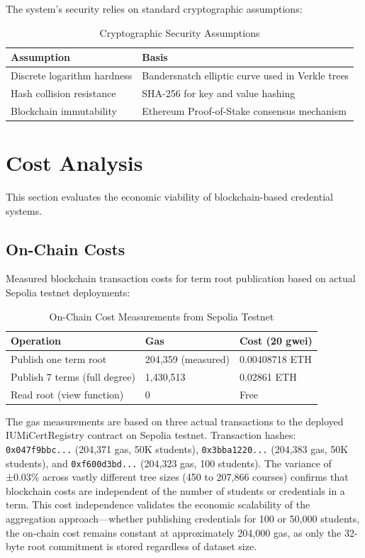 The system's security relies on standard cryptographic assumptions:

\begin{table}[H]
\centering
\caption{Cryptographic Security Assumptions}
\label{tab:crypto-assumptions}
\begin{tabular}{|p{5.5cm}|p{6.5cm}|}
\hline
\textbf{Assumption} & \textbf{Basis} \\
\hline
Discrete logarithm hardness & Bandersnatch elliptic curve used in Verkle trees \\
\hline
Hash collision resistance & SHA-256 for key and value hashing \\
\hline
Blockchain immutability & Ethereum Proof-of-Stake consensus mechanism \\
\hline
\end{tabular}
\end{table}

\section{Cost Analysis}
\label{sec:cost-analysis}

This section evaluates the economic viability of blockchain-based credential systems.

\subsection{On-Chain Costs}
\label{subsec:onchain-costs}

Measured blockchain transaction costs for term root publication based on actual Sepolia testnet deployments:

\begin{table}[H]
\centering
\caption{On-Chain Cost Measurements from Sepolia Testnet}
\label{tab:onchain-costs}
\begin{tabular}{|p{5.5cm}|p{3cm}|p{3.5cm}|}
\hline
\textbf{Operation} & \textbf{Gas} & \textbf{Cost (20 gwei)} \\
\hline
Publish one term root & 204,359 (measured) & 0.00408718 ETH \\
\hline
Publish 7 terms (full degree) & 1,430,513 & 0.02861 ETH \\
\hline
Read root (view function) & 0 & Free \\
\hline
\end{tabular}
\end{table}

The gas measurements are based on three actual transactions to the deployed IUMiCertRegistry contract on Sepolia testnet. Transaction hashes: \texttt{0x047f9bbc...} (204,371 gas, 50K students), \texttt{0x3bba1220...} (204,383 gas, 50K students), and \texttt{0xf600d3bd...} (204,323 gas, 100 students). The variance of ±0.03\% across vastly different tree sizes (450 to 207,866 courses) confirms that blockchain costs are independent of the number of students or credentials in a term. This cost independence validates the economic scalability of the aggregation approach—whether publishing credentials for 100 or 50,000 students, the on-chain cost remains constant at approximately 204,000 gas, as only the 32-byte root commitment is stored regardless of dataset size.

